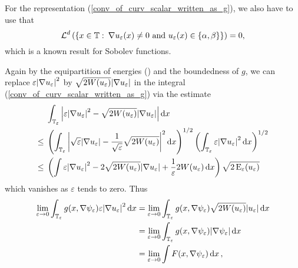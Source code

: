 For the representation (\ref{conv_of_curv_scalar_written_as_g}), we also have 
to use that 
\begin{equation*}
	\operatorname{\mathcal{L}}^{ d } \left(
	\left\{
	x \in \operatorname{\mathbb{T}}
	\, \colon \,
	\nabla u_{ \varepsilon } ( x ) \neq 0 \text{ and } u_{ \varepsilon } ( x ) 
	\in \{ \alpha , \beta \}
	\right\}
	\right)
	=
	0,
\end{equation*}
which is a known result for Sobolev functions.

Again by the equipartition of energies () and 
the boundedness of $ g $, we can replace $ \varepsilon \abs{ \nabla u_{ 
\varepsilon } }^{ 2 } $ by $ \sqrt{ 2 W ( u_{ \varepsilon } ) } \abs{ \nabla 
u_{ \varepsilon } } $ in the integral (\ref{conv_of_curv_scalar_written_as_g}) 
via the estimate
\begin{align*}
	& \int_{ \operatorname{\mathbb{T}}_{ \varepsilon } }
	\abs{ 
		\varepsilon \abs{ \nabla u_{ \varepsilon } }^{ 2 }
		-
		\sqrt{ 2 W ( u_{ \varepsilon } ) } \abs{ \nabla u_{\varepsilon } }
	}
	\dd{ x }
	\\
	\leq {} &
	\left(
	\int_{ \operatorname{\mathbb{T}}_{ \varepsilon } }
	\abs{ 
		\sqrt{ \varepsilon } \abs{ \nabla u_{ \varepsilon } } 
		- 
		\frac{ 1 }{ \sqrt{ \varepsilon } } \sqrt{ 2 W ( u_{ \varepsilon } ) } 
	}^{ 2 }
	\dd{ x }
	\right)^{ 1/2 }
	\left(
	\int_{ \operatorname{\mathbb{T}}_{ \varepsilon } }
	\varepsilon \abs{ \nabla u_{ \varepsilon } }^{ 2 }
	\dd{ x }
	\right)^{ 1/ 2 }
	\\
	\leq {} &
	\left(
	\int
	\varepsilon \abs{ \nabla u_{ \varepsilon } }^{ 2 }
	-
	2 \sqrt{ 2 W ( u_{ \varepsilon } ) } \abs{ \nabla u_{ \varepsilon } }
	+
	\frac{ 1 }{ \varepsilon }
	2 W ( u_{ \varepsilon } )
	\dd{ x }
	\right)
	\sqrt{ 2 \operatorname{E}_{ \varepsilon } ( u_{ \varepsilon } ) }
\end{align*}
which vanishes as $ \varepsilon $ tends to zero.
Thus
\begin{align*}
	\lim_{ \varepsilon \to 0 }
	\int_{ \operatorname{\mathbb{T}}_{ \varepsilon } }
	g ( x , \nabla \psi_{ \varepsilon  } )
	\varepsilon \abs{ \nabla u_{ \varepsilon } }^{ 2 }
	\dd{ x }
	& =
	\lim_{ \varepsilon \to 0 }
	\int_{ \operatorname{\mathbb{T}}_{ \varepsilon } }
	g ( x , \nabla \psi_{ \varepsilon  } )
	\sqrt{ 2 W ( u_{ \varepsilon } ) } 
	\abs{ u_{ \varepsilon } }
	\dd{ x }
	\\
	& =
	\lim_{ \varepsilon \to 0 }
	\int_{ \operatorname{\mathbb{T}}_{ \varepsilon } }
	g ( x , \nabla \psi_{ \varepsilon  } ) \abs{ \nabla \psi_{ \varepsilon  } }
	\dd{ x }
	\\
	& = 
	\lim_{ \varepsilon \to 0 }
	\int
	F ( x, \nabla \psi_{ \varepsilon } )
	\dd{ x },
\end{align*}
